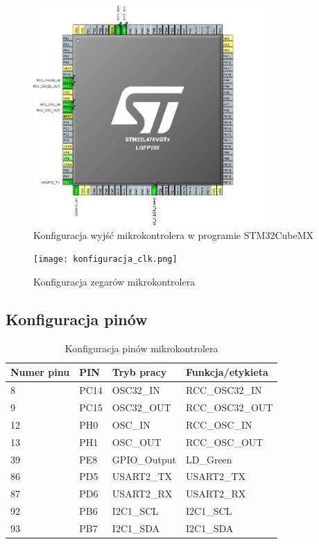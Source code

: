 \documentclass[10pt, a4paper]{article}
\begin{document}
\begin{figure}[H]
	\centering
	\includegraphics[width=0.8\textwidth]{konfiguracja_mcu.png}
	\caption{Konfiguracja wyjść mikrokontrolera w programie STM32CubeMX}
	\label{fig:KonfiguracjaMikrokontrolera}
\end{figure}

\newpage
\begin{figure}[H]
	\centering
	\texttt{[image: konfiguracja\_clk.png]}
	\caption{Konfiguracja zegarów mikrokontrolera}
	\label{fig:KonfiguracjaZegara}
\end{figure}

\subsection{Konfiguracja pinów}

\begin{table}[H]
	\centering
	\begin{tabular}{|l|l|l|l|}
		\hline
		Numer pinu	&	PIN & Tryb pracy & Funkcja/etykieta\\
		\hline
		8&	PC14 & OSC32\_IN &	RCC\_OSC32\_IN	\\
		9&	PC15 & OSC32\_OUT &	RCC\_OSC32\_OUT	\\
		12&	PH0 & OSC\_IN &	RCC\_OSC\_IN	\\
		13&	PH1 & OSC\_OUT &	RCC\_OSC\_OUT	\\
		39&	PE8 &	GPIO\_Output&	LD\_Green \\
		86&	PD5 &	USART2\_TX&	USART2\_TX\\
		87&	PD6 &	USART2\_RX&	USART2\_RX\\
		92&	PB6 &	I2C1\_SCL&	I2C1\_SCL\\
		93&	PB7 &	I2C1\_SDA&	I2C1\_SDA\\
		\hline
	\end{tabular}
	\caption{Konfiguracja pinów mikrokontrolera}
	\label{tab:KonfiguracjaPinów}	
\end{table}
\end{document}
